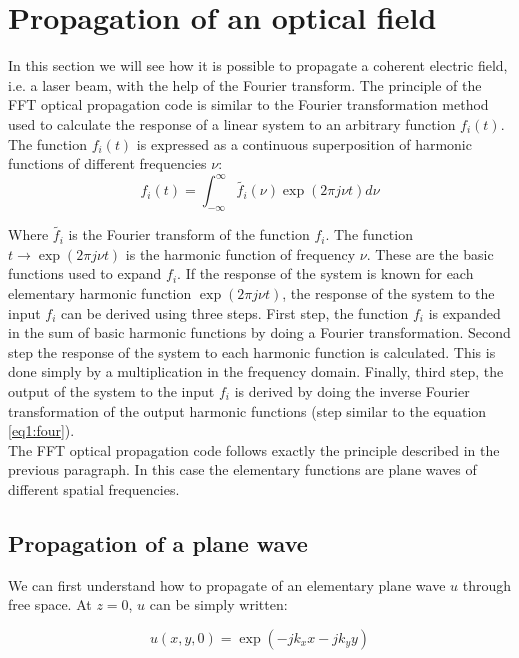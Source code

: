 \section{Propagation of an optical field}
\label{sec1.2}

In this section we will see how it is possible to propagate a coherent electric field, i.e. a laser beam, with the help of the Fourier transform. The principle of the FFT optical propagation code is similar to the Fourier transformation method used to calculate the response of a linear system to an arbitrary function $f_i(t)$. The function $f_i(t)$ is expressed as a continuous superposition of harmonic functions of different frequencies $\nu$:
\begin{equation}
 f_i(t) = \int_{-\infty}^{\infty} \widetilde{f_i}(\nu) \exp(2\pi j \nu t) d\nu
\label{eq1:four}
\end{equation}

\noindent Where $\widetilde{f_i}$ is the Fourier transform of the function $f_i$. The function $ t\rightarrow \exp(2\pi j \nu t)$ is the harmonic function of frequency $\nu$. These are the basic functions used to expand $f_i$. If the response of the system is known for each elementary harmonic function $\exp(2\pi j \nu t)$, the response of the system to the input $f_i$ can be derived using three steps. First step, the function $f_i$ is expanded in the sum of basic harmonic functions by doing a Fourier transformation. Second step the response of the system to each harmonic function is calculated. This is done simply by a multiplication in the frequency domain. Finally, third step, the output of the system to the input $f_i$ is derived by doing the inverse Fourier transformation of the output harmonic functions (step similar to the equation \ref{eq1:four}).\\

The FFT optical propagation code follows exactly the principle described in the previous paragraph. In this case the elementary functions are plane waves of different spatial frequencies.

\subsection{Propagation of a plane wave}

We can first understand how to propagate of an elementary plane wave $u$ through free space. At $z = 0$, $u$ can be simply written:

\begin{equation}
u(x,y,0) = \exp(-j k_x x - j k_y y)
\label{eq1:uel}
\end{equation}

